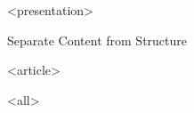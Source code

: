\mode
<presentation>

\begin{frame}{Separate Content from Structure}
  \label{separate:cs}

  \begin{example}
  \end{example}


\end{frame}




\mode
<article>

\bigskip


\clearpage

\mode
<all>
